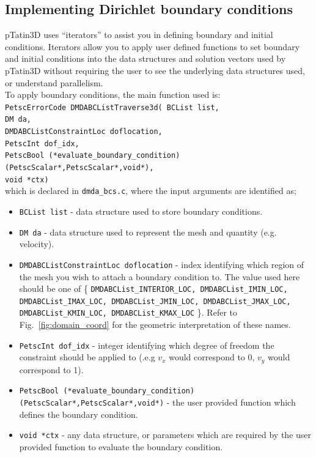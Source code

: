 \documentclass[paper=a4, fontsize=11pt,twoside]{scrartcl}
\newcommand{\ptat}{{{\sc pTatin3D}}}
\newcommand{\shellcmd}[1]{\\\indent\indent\texttt{\hspace{5mm}\footnotesize #1}\\}
\newcommand{\unix}[1]{\texttt{\footnotesize #1}}
\begin{document}
{{\subsection{Implementing Dirichlet boundary conditions}
{\ptat} uses ``iterators'' to assist you in defining boundary and initial conditions. Iterators allow you to apply user defined functions to set boundary and initial conditions into the data structures and solution vectors used by {\ptat} without requiring the user to see the underlying data structures used, or understand parallelism.
\\[8pt]
To apply boundary conditions, the main function used is:
\shellcmd{PetscErrorCode DMDABCListTraverse3d( \newline
 BCList list, \\
  DM da, \\
  DMDABCListConstraintLoc doflocation, \\
  PetscInt dof\_idx, \\
  PetscBool (*evaluate\_boundary\_condition)(PetscScalar*,PetscScalar*,void*), \\
  void *ctx)} 
which is declared in \unix{dmda\_bcs.c}, where the input arguments are identified as;
\begin{itemize}
\item[] \unix{BCList list} - data structure used to store boundary conditions.
\item[] \unix{DM da} - data structure used to represent the mesh and quantity (e.g. velocity).
\item[] \unix{DMDABCListConstraintLoc doflocation} - index identifying which region of the mesh you wish to attach a boundary condition to. The value used here should be one of 
	\{ \unix{DMDABCList\_INTERIOR\_LOC, 
	DMDABCList\_IMIN\_LOC,
	DMDABCList\_IMAX\_LOC,
	DMDABCList\_JMIN\_LOC,
	DMDABCList\_JMAX\_LOC,
	DMDABCList\_KMIN\_LOC,
	DMDABCList\_KMAX\_LOC} \}.
Refer to Fig.~\ref{fig:domain_coord} for the geometric interpretation of these names.
\item[] \unix{PetscInt dof\_idx} - integer identifying which degree of freedom the constraint should be applied to (.e.g $v_x$ would correspond to 0, $v_y$ would correspond to 1).
\item[] \unix{PetscBool (*evaluate\_boundary\_condition)(PetscScalar*,PetscScalar*,void*)} - the user provided function which defines the boundary condition.
\item[] \unix{void *ctx} - any data structure, or parameters which are required by the user provided function to evaluate the boundary condition.
\end{itemize}

}}
\end{document}
